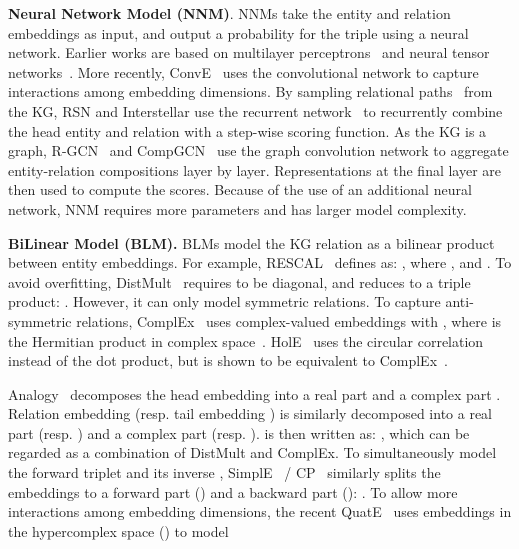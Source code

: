 \documentclass[10pt,journal,compsoc]{IEEEtran}
\newcommand{\parabegin}[1]{\vspace{3px}\noindent\textbf{#1}}
\begin{document}
\parabegin{Neural Network Model (NNM)}.
NNMs take the 
entity and relation 
embeddings 
as input, and
output a probability for the triple  using a neural network.
Earlier works are
based on multilayer perceptrons~\cite{dong2014knowledge} 
and neural tensor networks~\cite{socher2013reasoning}.
More recently,
ConvE~\cite{dettmers2017convolutional}
uses the convolutional network to 
capture interactions among embedding dimensions.
By sampling relational paths~\cite{guu2015traversing} from the KG,
RSN 
\cite{guo2019learning}
and Interstellar \cite{zhang2020interstellar}
use the recurrent network~\cite{hochreiter1997long} to recurrently combine the head entity and
relation 
with a step-wise scoring function.
As the KG is a graph,
R-GCN~\cite{schlichtkrull2018modeling} 
and CompGCN~\cite{vashishth2019composition} use the graph convolution network
\cite{kipf2016semi}
to aggregate entity-relation compositions layer by layer.
Representations 
at the final layer 
are then used to compute the scores.
Because of the use of an additional neural network,
NNM requires more parameters and has larger model complexity.


\parabegin{BiLinear Model (BLM).}
BLMs model the KG relation as a bilinear product between entity embeddings.
For example, RESCAL~\cite{nickel2011three} 
defines  as:
,
where , and 
.
To avoid overfitting, DistMult~\cite{yang2014embedding} requires
 to be 
diagonal, and
 reduces to a triple product:
.
However, it can only model symmetric relations.
To capture anti-symmetric relations,
ComplEx~\cite{trouillon2017knowledge} uses complex-valued embeddings  
with 
,
where 
 is the Hermitian product in complex space~\cite{trouillon2017knowledge}.
HolE~\cite{nickel2016holographic} uses the circular correlation instead of the dot product,
but is shown to be equivalent to ComplEx~\cite{hayashi2017equivalence}.

Analogy~\cite{liu2017analogical} decomposes the head embedding  into a real part 
and a complex part
.
Relation embedding  (resp. tail embedding ) is similarly decomposed into 
a real part  (resp. )
and a complex part
 (resp. ).  is then written
as:
,
which can be regarded as a combination of DistMult and ComplEx.
To simultaneously model the forward triplet  and its inverse ,
SimplE~\cite{kazemi2018simple} / CP~\cite{lacroix2018canonical} 
similarly
splits the embeddings to a forward part 
()
and a backward part ():
.
To allow more interactions among embedding dimensions,
the recent QuatE~\cite{zhang2019quaternion} 
uses embeddings in the hypercomplex space () to 
model
\end{document}
